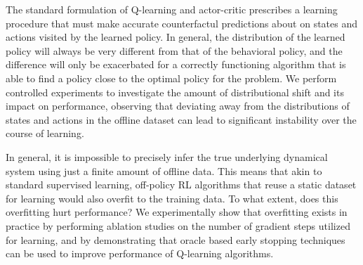 

The standard formulation of Q-learning and actor-critic prescribes a learning procedure that must make accurate counterfactul predictions about on states and actions visited by the learned policy. In general, the distribution of the learned policy will always be very different from that of the behavioral policy, and the difference will only be exacerbated for a correctly functioning algorithm that is able to find a policy close to the optimal policy for the problem. We perform controlled experiments to investigate the amount of distributional shift and its impact on performance, observing that deviating away from the distributions of states and actions in the offline dataset can lead to significant instability over the course of learning.




In general, it is impossible to precisely infer the true underlying dynamical system using just a finite amount of offline data. This means that akin to standard supervised learning, off-policy RL algorithms that reuse a static dataset for learning would also overfit to the training data. To what extent, does this overfitting hurt performance? We experimentally show that overfitting exists in practice by performing ablation studies on the number of gradient steps utilized for learning, and by demonstrating that oracle based early stopping techniques can be used to improve performance of Q-learning algorithms.


